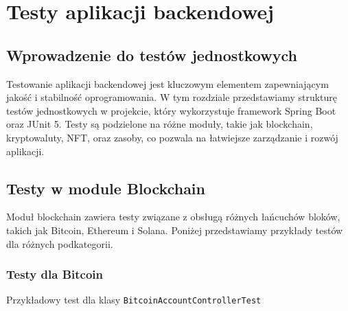 \chapter{Testy aplikacji backendowej}

\section{Wprowadzenie do testów jednostkowych}

Testowanie aplikacji backendowej jest kluczowym elementem zapewniającym jakość i stabilność oprogramowania. W tym rozdziale przedstawiamy strukturę testów jednostkowych w projekcie, który wykorzystuje framework Spring Boot oraz JUnit 5. Testy są podzielone na różne moduły, takie jak blockchain, kryptowaluty, NFT, oraz zasoby, co pozwala na łatwiejsze zarządzanie i rozwój aplikacji.

\section{Testy w module Blockchain}

Moduł blockchain zawiera testy związane z obsługą różnych łańcuchów bloków, takich jak Bitcoin, Ethereum i Solana. Poniżej przedstawiamy przykłady testów dla różnych podkategorii.

\subsection{Testy dla Bitcoin}

Przykładowy test dla klasy \texttt{BitcoinAccountControllerTest}

